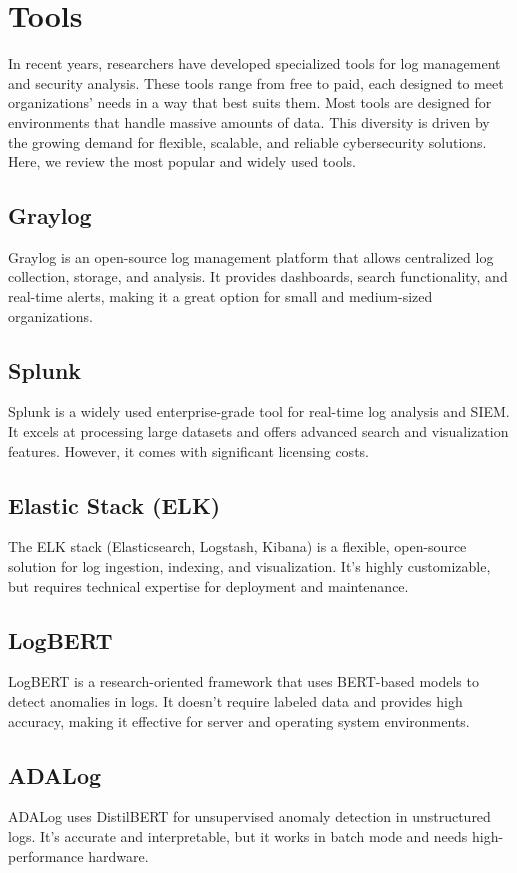 \documentclass[12pt,a4paper]{report} %
\begin{document}
\section{Tools}
In recent years, researchers have developed specialized tools for log management and security analysis. These tools range from free to paid, each designed to meet organizations' needs in a way that best suits them. Most tools are designed for environments that handle massive amounts of data. This diversity is driven by the growing demand for flexible, scalable, and reliable cybersecurity solutions. Here, we review the most popular and widely used tools.
\subsection{Graylog}
Graylog \cite{GraylogDocs} is an open-source log management platform that allows centralized log collection, storage, and analysis. It provides dashboards, search functionality, and real-time alerts, making it a great option for small and medium-sized organizations.

\subsection{Splunk}
Splunk \cite{SplunkDocs} is a widely used enterprise-grade tool for real-time log analysis and SIEM. It excels at processing large datasets and offers advanced search and visualization features. However, it comes with significant licensing costs.

\subsection{Elastic Stack (ELK)}
The ELK stack \cite{ElasticDocs} (Elasticsearch, Logstash, Kibana) is a flexible, open-source solution for log ingestion, indexing, and visualization. It's highly customizable, but requires technical expertise for deployment and maintenance.

\subsection{LogBERT}
LogBERT is a research-oriented framework that uses BERT-based models to detect anomalies in logs. It doesn't require labeled data and provides high accuracy, making it effective for server and operating system environments.

\subsection{ADALog}
ADALog uses DistilBERT for unsupervised anomaly detection in unstructured logs. It's accurate and interpretable, but it works in batch mode and needs high-performance hardware.
\end{document}
